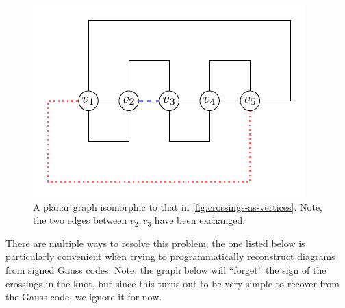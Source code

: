 \begin{figure}[H]
  \centering
  \includegraphics[scale=.75]{figures/unknotting-moves-and-combinatorial-representations/5-1-alternative-planar-graph.pdf}
  \caption{A planar graph isomorphic to that in
    \cref{fig:crossings-as-vertices}. Note, the two edges between
    $v_2, v_3$ have been exchanged.}
  \label{fig:alt-crossings-as-vertices}
\end{figure}
There are multiple ways to resolve this problem; the one listed below
is particularly convenient when trying to programmatically reconstruct
diagrams from signed Gauss codes.%
Note, the graph below will ``forget''
the sign of the crossings in the knot, but since this turns out to be
very simple to recover from the Gauss code, we ignore it for now.
